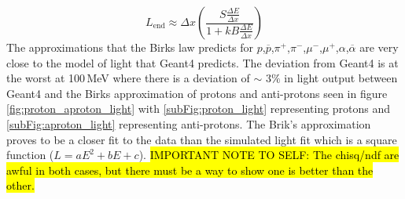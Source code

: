 \begin{equation}
L_{\textrm{end}}\approx \Delta x \left(\frac{S\frac{\Delta E}{\Delta x}}{1 + kB \frac{\Delta E}{\Delta x}}\right) 
\label{equ:light_produced}
\end{equation}
The approximations that the Birks law predicts for $p$,$\overline{p}$,$\pi^+$,$\pi^-$,$\mu^-$,$\mu^+$,$\alpha$,$\overline{\alpha}$ are very close to the model of light that Geant4 predicts. The deviation from Geant4 is at the worst at 100\,MeV where there is a deviation of $\sim$ $3\%$ in light output between Geant4 and the Birks approximation of protons and anti-protons seen in figure \ref{fig:proton_aproton_light} with \ref{subFig:proton_light} representing protons and \ref{subFig:aproton_light} representing anti-protons. The Brik's approximation proves to be a closer fit to the data than the simulated light fit which is a square function ($L = aE^2 + bE+ c$). \hl{IMPORTANT NOTE TO SELF: The chisq/ndf are awful in both cases, but there must be a way to show one is better than the other.}
